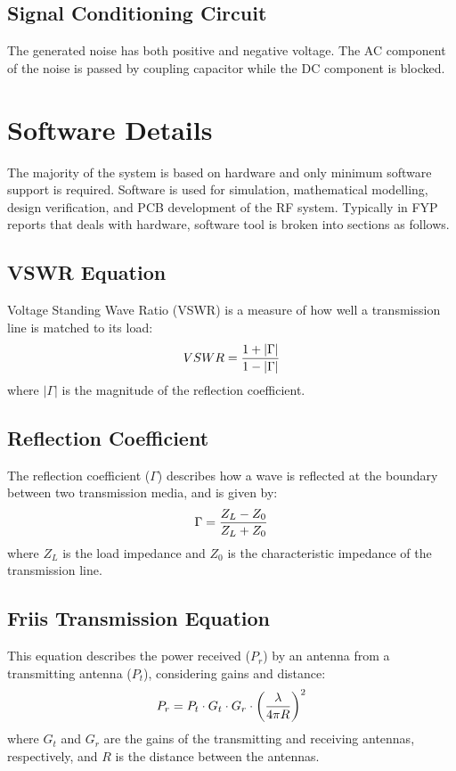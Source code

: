 \documentclass[12pt,a4paper]{report}
\begin{document}
	\subsection{Signal Conditioning Circuit}
	The generated noise has both positive and negative voltage. The AC component of the noise is passed by coupling capacitor while the DC component is blocked.
	
	\section{Software Details}
	The majority of the system is based on hardware and only minimum software support is required. Software is used for simulation, mathematical modelling, design verification, and PCB development of the RF system. Typically in FYP reports that deals with hardware, software tool is broken into sections as follows.
	
	
	\subsection{VSWR Equation}
	Voltage Standing Wave Ratio (VSWR) is a measure of how well a transmission line is matched to its load:
	\begingroup
	\setlength{\mathindent}{0pt}
	\begin{equation*}
		\hfill
		VSWR = \frac{1 + |\Gamma|}{1 - |\Gamma|}
		\hfill
	\end{equation*}
	\endgroup
	where $|\Gamma|$ is the magnitude of the reflection coefficient.
	\subsection{Reflection Coefficient}
	The reflection coefficient ($\Gamma$) describes how a wave is reflected at the boundary between two transmission media, and is given by:
	\begingroup
	\setlength{\mathindent}{0pt}
	\begin{equation*}
		\hfill
		\Gamma = \frac{Z_L - Z_0}{Z_L + Z_0}
		\hfill
	\end{equation*}
	\endgroup
	where $Z_L$ is the load impedance and $Z_0$ is the characteristic impedance of the transmission line.
	\subsection{Friis Transmission Equation}
	This equation describes the power received ($P_r$) by an antenna from a transmitting antenna ($P_t$), considering gains and distance:
	\begingroup
	\setlength{\mathindent}{0pt}
	\begin{equation*}
		\hfill
		P_r = P_t \cdot G_t \cdot G_r \cdot \left(\frac{\lambda}{4\pi R}\right)^2
		\hfill
	\end{equation*}
	\endgroup
	where $G_t$ and $G_r$ are the gains of the transmitting and receiving antennas, respectively, and $R$ is the distance between the antennas.
	
\end{document}
